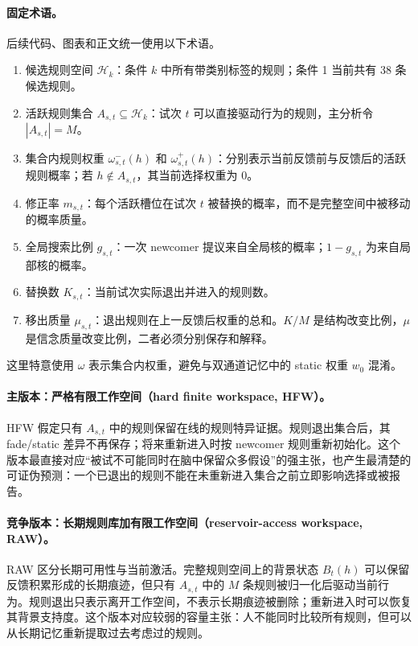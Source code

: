 \paragraph{固定术语。}
后续代码、图表和正文统一使用以下术语。
\begin{enumerate}
    \item 候选规则空间 $\mathcal H_k$：条件 $k$ 中所有带类别标签的规则；条件 1 当前共有 38 条候选规则。
    \item 活跃规则集合 $A_{s,t}\subseteq\mathcal H_k$：试次 $t$ 可以直接驱动行为的规则，主分析令 $|A_{s,t}|=M$。
    \item 集合内规则权重 $\omega^-_{s,t}(h)$ 和 $\omega^+_{s,t}(h)$：分别表示当前反馈前与反馈后的活跃规则概率；若 $h\notin A_{s,t}$，其当前选择权重为 0。
    \item 修正率 $m_{s,t}$：每个活跃槽位在试次 $t$ 被替换的概率，而不是完整空间中被移动的概率质量。
    \item 全局搜索比例 $g_{s,t}$：一次 newcomer 提议来自全局核的概率；$1-g_{s,t}$ 为来自局部核的概率。
    \item 替换数 $K_{s,t}$：当前试次实际退出并进入的规则数。
    \item 移出质量 $\mu_{s,t}$：退出规则在上一反馈后权重的总和。$K/M$ 是结构改变比例，$\mu$ 是信念质量改变比例，二者必须分别保存和解释。
\end{enumerate}
这里特意使用 $\omega$ 表示集合内权重，避免与双通道记忆中的 static 权重 $w_0$ 混淆。

\paragraph{主版本：严格有限工作空间（hard finite workspace, HFW）。}
HFW 假定只有 $A_{s,t}$ 中的规则保留在线的规则特异证据。规则退出集合后，其 fade/static 差异不再保存；将来重新进入时按 newcomer 规则重新初始化。这个版本最直接对应“被试不可能同时在脑中保留众多假设”的强主张，也产生最清楚的可证伪预测：一个已退出的规则不能在未重新进入集合之前立即影响选择或被报告。

\paragraph{竞争版本：长期规则库加有限工作空间（reservoir-access workspace, RAW）。}
RAW 区分长期可用性与当前激活。完整规则空间上的背景状态 $B_t(h)$ 可以保留反馈积累形成的长期痕迹，但只有 $A_{s,t}$ 中的 $M$ 条规则被归一化后驱动当前行为。规则退出只表示离开工作空间，不表示长期痕迹被删除；重新进入时可以恢复其背景支持度。这个版本对应较弱的容量主张：人不能同时比较所有规则，但可以从长期记忆重新提取过去考虑过的规则。

